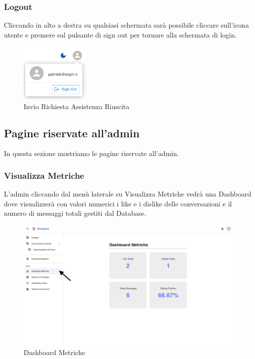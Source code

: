 \subsubsection{Logout}
Cliccando in alto a destra su qualsiasi schermata sarà possibile cliccare sull'icona utente e premere sul pulsante di sign out per tornare alla schermata di login.
\begin{figure}[h!]
    \centering
    \includegraphics[width=0.3\textwidth]{./img/logout.png}
    \caption{Invio Richiesta Assistenza Riuscita}
\end{figure}

\subsection{Pagine riservate all'admin}
In questa sezione mostriamo le pagine riservate all'admin.

\subsubsection{Visualizza Metriche}
L'admin cliccando dal menù laterale su Visualizza Metriche vedrà una Dashboard dove visualizzerà con valori numerici i like e i dislike delle conversazioni e il numero di messaggi totali gestiti dal Database.
\begin{figure}[h!]
    \centering
    \includegraphics[width=\textwidth]{./img/visualizzaMetriche.png}
    \caption{Dashboard Metriche}
    \label{fig:Metriche}
\end{figure}

